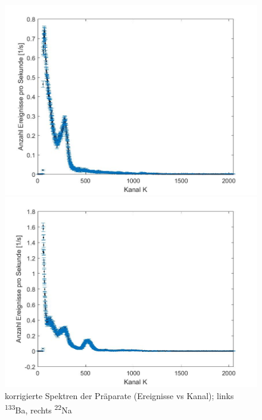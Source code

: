 \documentclass[aps,twocolumn,secnumarabic,nobalancelastpage,amsmath,amssymb,
nofootinbib,superscriptaddress]{revtex4-1}
\begin{document}
\begin{figure}[b]
  \begin{minipage}[t]{0.49\textwidth}
    \includegraphics[width=\textwidth]{../Messung/BaK.jpg}
  \end{minipage}
  \begin{minipage}[t]{0.49\textwidth}
    \includegraphics[width=\textwidth]{../Messung/NaK.jpg}
  \end{minipage}
  \caption{\label{fig:spektrenK1} korrigierte Spektren der Präparate (Ereignisse vs Kanal); links \textsuperscript{133}Ba, rechts \textsuperscript{22}Na}
\end{figure}
\end{document}
